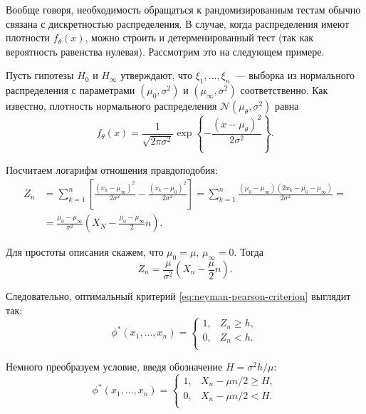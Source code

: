 Вообще говоря, необходимость обращаться к рандомизированным тестам обычно 
связана с дискретностью распределения. В случае, когда распределения имеют 
плотности \(f_{\theta}(x)\), можно строить и детерменированный тест (так как 
вероятность равенства нулевая). Рассмотрим это на следующем примере.
\begin{example}
	Пусть гипотезы \(H_{0}\) и \(H_{\infty}\) утверждают, что \(\xi_{1}, 
	\ldots, \xi_{n}\)~--- выборка из нормального распределения 
	с параметрами \((\mu_{0}, \sigma^{2})\) и \((\mu_{\infty}, \sigma^{2})\) 
	соответственно. Как известно, плотность нормального распределения 
	\(\mathcal{N}(\mu_{\theta}, \sigma^{2})\) равна
	\[
		f_{\theta}(x) = \frac{1}{\sqrt{2\pi\sigma^{2}}}\exp\left\{-\frac{(x - 
		\mu_{\theta})^{2}}{2\sigma^{2}}\right\}.
	\]
	
	Посчитаем логарифм отношения правдоподобия:
	\begin{align*}
		Z_{n} &= \sum_{k = 1}^{n} \left[\frac{(x_{k} - \mu_{\infty})^{2}} 
		{2\sigma^{2}} - \frac{(x_{k} - \mu_{0})^{2}}{2\sigma^{2}}\right] = 
		\sum_{k = 1}^{n} \frac{(\mu_{0} - \mu_{\infty})(2x_{k} - \mu_{0} - 
		\mu_{\infty})}{2\sigma^{2}} = \\
		&= \frac{\mu_{0} - \mu_{\infty}}{\sigma^{2}}\left(X_{N} - \frac{\mu_{0} 
		- \mu_{\infty}}{2}n\right).
	\end{align*}
	
	Для простоты описания скажем, что \(\mu_{0} = \mu\), \(\mu_{\infty} = 0\). 
	Тогда
	\[
		Z_{n} = \frac{\mu}{\sigma^{2}}\left(X_{n} - \frac{\mu}{2}n\right).
	\]
	
	Следовательно, оптимальный критерий \eqref{eq:neyman-pearson-criterion} 
	выглядит так:
	\[
		\phi^{*}(x_{1}, \ldots, x_{n}) = 
		\begin{cases}
			1, & Z_{n} \geq h, \\
			0, & Z_{n} < h. \\
		\end{cases}
	\]
	
	Немного преобразуем условие, введя обозначение \(H = \sigma^{2}h/\mu\):
	\begin{equation}
		\phi^{*}(x_{1}, \ldots, x_{n}) = 
		\begin{cases}
		1, & X_{n} - \mu n/2 \geq H, \\
		0, & X_{n} - \mu n/2 < H. \\
		\end{cases}
	\end{equation}
	

\end{example}
